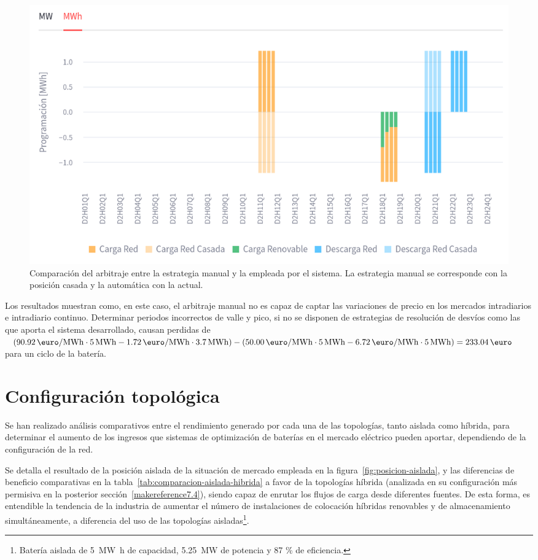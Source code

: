 \begin{figure}
  \centering
  \includegraphics[width=0.75\linewidth]{figures/manual-auto-posicion.png}
  \caption[Comparación del arbitraje entre la estrategia manual y la automática.]{Comparación del arbitraje entre la estrategia manual y la empleada por el sistema. La estrategia manual se corresponde con la posición casada y la automática con la actual.}%
  \label{fig:manual-auto-posicion}
\end{figure}

Los resultados muestran como, en este caso, el arbitraje manual no es capaz de captar las variaciones de precio en los mercados intradiarios e intradiario continuo. Determinar periodos incorrectos de valle y pico, si no se disponen de estrategias de resolución de desvíos como las que aporta el sistema desarrollado, causan perdidas de \( (\SI{90.92}{\text{\euro}\per\mega\watt\hour} \cdot \SI{5}{{\mega\watt\hour}} - \SI{1.72}{\text{\euro}\per\mega\watt\hour} \cdot \SI{3.7}{{\mega\watt\hour}} ) - (\SI{50.00}{\text{\euro}\per\mega\watt\hour} \cdot \SI{5}{{\mega\watt\hour}} - \SI{6.72}{\text{\euro}\per\mega\watt\hour} \cdot \SI{5}{{\mega\watt\hour}}) = \SI{233.04}{\text{\euro}} \) para un ciclo de la batería.

\section{Configuración topológica}%
\label{makereference7.3}

Se han realizado análisis comparativos entre el rendimiento generado por cada una de las topologías, tanto aislada como híbrida, para determinar el aumento de los ingresos que sistemas de optimización de baterías en el mercado eléctrico pueden aportar, dependiendo de la configuración de la red.

Se detalla el resultado de la posición aislada de la situación de mercado empleada en la figura~\ref{fig:posicion-aislada}, y las diferencias de beneficio comparativas en la tabla~\ref{tab:comparacion-aislada-hibrida} a favor de la topologías híbrida (analizada en su configuración más permisiva en la posterior sección~\ref{makereference7.4}), siendo capaz de enrutar los flujos de carga desde diferentes fuentes. De esta forma, es entendible la tendencia de la industria de aumentar el número de instalaciones de colocación híbridas renovables y de almacenamiento simultáneamente, a diferencia del uso de las topologías aisladas\footnote{Batería aislada de \SI{5}{{\mega\watt\hour}} de capacidad, \SI{5.25}{{\mega\watt}} de potencia y 87 \% de eficiencia.}.

